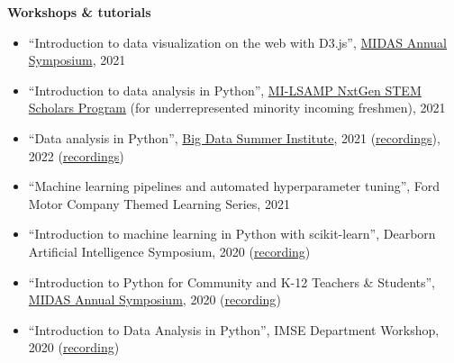 \documentclass[11pt]{article}
\newenvironment{main}
{\begin{adjustwidth}{3em}{}}
{\end{adjustwidth}}
\begin{document}
\begin{main}
\textbf{Workshops \& tutorials}

\begin{itemize}
    \item ``Introduction to data visualization on the web with D3.js'', \href{https://midas.umich.edu/2021-symposium/}{MIDAS Annual Symposium}, 2021
    \item ``Introduction to data analysis in Python'', \href{https://www.milsamp.org/programs/nxtgen-stem-scholars/}{MI-LSAMP NxtGen STEM Scholars Program} (for underrepresented minority incoming freshmen), 2021
    \item ``Data analysis in Python'', \href{https://sph.umich.edu/bdsi/}{Big Data Summer Institute}, 
    2021 (\href{http://bigdatasummerinst.sph.umich.edu/wiki/index.php/Main_Page#Week_2}{recordings}), 
    2022 (\href{http://bigdatasummerinst.sph.umich.edu/wiki2022/index.php/Main_Page#Week_2}{recordings})
    \item ``Machine learning pipelines and automated hyperparameter tuning'', Ford Motor Company Themed Learning Series, 2021
    \item ``Introduction to machine learning in Python with scikit-learn'', Dearborn Artificial Intelligence Symposium, 2020 (\href{https://www.youtube.com/watch?v=TD4wCHNhZcU}{recording})
    \item ``Introduction to Python for Community and K-12 Teachers \& Students'', \href{https://midas.umich.edu/2020-symposium/}{MIDAS Annual Symposium}, 2020 (\href{https://youtu.be/r_sfBJIDMtM}{recording})
    \item ``Introduction to Data Analysis in Python'', IMSE Department Workshop, 2020 (\href{https://youtu.be/7IsFmtvBOyc}{recording})
\end{itemize}


\end{main}
\end{document}
